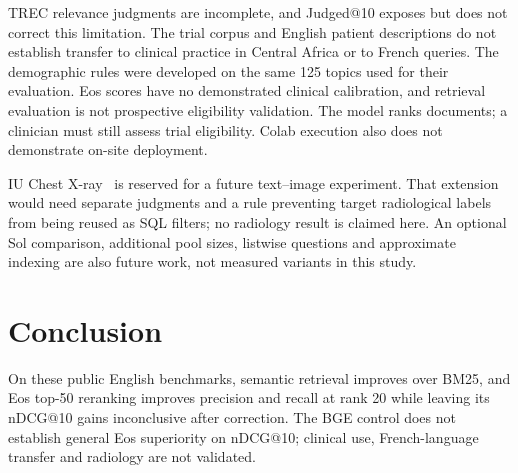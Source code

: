 \documentclass{article}
\begin{document}
TREC relevance judgments are incomplete, and Judged@10 exposes but does not correct this limitation. The trial corpus and English patient descriptions do not establish transfer to clinical practice in Central Africa or to French queries. The demographic rules were developed on the same 125 topics used for their evaluation. Eos scores have no demonstrated clinical calibration, and retrieval evaluation is not prospective eligibility validation. The model ranks documents; a clinician must still assess trial eligibility. Colab execution also does not demonstrate on-site deployment.

IU Chest X-ray~\citep{demnerfushman2016iuxray} is reserved for a future text--image experiment. That extension would need separate judgments and a rule preventing target radiological labels from being reused as SQL filters; no radiology result is claimed here. An optional Sol comparison, additional pool sizes, listwise questions and approximate indexing are also future work, not measured variants in this study.

\section{Conclusion}

On these public English benchmarks, semantic retrieval improves over BM25, and Eos top-50 reranking improves precision and recall at rank 20 while leaving its nDCG@10 gains inconclusive after correction. The BGE control does not establish general Eos superiority on nDCG@10; clinical use, French-language transfer and radiology are not validated.

\small


\end{document}

